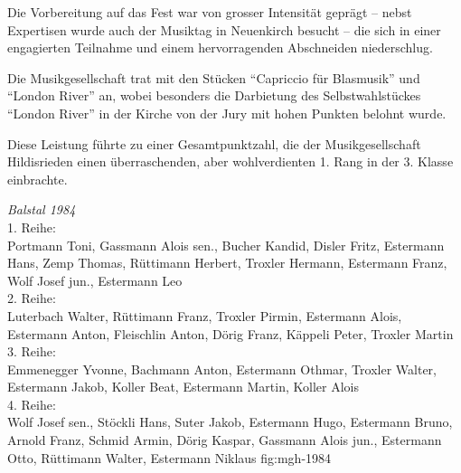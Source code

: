 \begin{history}
    Die Vorbereitung auf das Fest war von grosser Intensität geprägt -- nebst
    Expertisen wurde auch der Musiktag in Neuenkirch besucht -- die sich in einer
    engagierten Teilnahme und einem hervorragenden Abschneiden niederschlug.

    Die Musikgesellschaft trat mit den Stücken \enquote{Capriccio für Blasmusik}
    und \enquote{London River} an, wobei besonders die Darbietung des
    Selbstwahlstückes \enquote{London River} in der Kirche von der Jury mit
    hohen Punkten belohnt wurde.

    Diese Leistung führte zu einer Gesamtpunktzahl, die der Musikgesellschaft
    Hildisrieden einen überraschenden, aber wohlverdienten 1. Rang in der 3.
    Klasse einbrachte.

\end{history}

{\emph{Balstal 1984}\\
    1. Reihe:\\
    Portmann Toni, Gassmann Alois sen., Bucher Kandid, Disler Fritz, Estermann
    Hans, Zemp Thomas, Rüttimann Herbert, Troxler Hermann, Estermann Franz, Wolf
    Josef jun., Estermann Leo\\
    2. Reihe:\\
    Luterbach Walter, Rüttimann Franz, Troxler Pirmin, Estermann Alois,
    Estermann Anton, Fleischlin Anton, Dörig Franz, Käppeli Peter, Troxler
    Martin\\
    3. Reihe:\\
    Emmenegger Yvonne, Bachmann Anton, Estermann Othmar, Troxler Walter,
    Estermann Jakob, Koller Beat, Estermann Martin, Koller Alois\\
    4. Reihe:\\
    Wolf Josef sen., Stöckli Hans, Suter Jakob, Estermann Hugo, Estermann Bruno,
    Arnold Franz, Schmid Armin, Dörig Kaspar, Gassmann Alois jun., Estermann
    Otto, Rüttimann Walter, Estermann Niklaus } {fig:mgh-1984}

